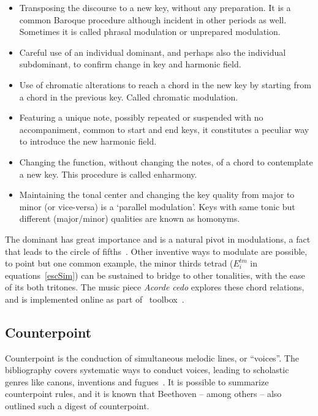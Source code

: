 \begin{itemize}
    \item Transposing the discourse to a new key, without any preparation. It is a common Baroque procedure although incident in other periods as well. Sometimes it is 
    called phrasal modulation or unprepared modulation.
    \item Careful use of an individual dominant, and perhaps also the individual
    subdominant, to confirm change in key and harmonic field.
    \item Use of chromatic alterations to reach a chord in the new key by starting from a chord in the previous key. Called chromatic modulation.
    \item Featuring a unique note, possibly repeated or suspended with no accompaniment, common to start and end keys, it constitutes a peculiar way
    to introduce the new harmonic field.
    \item Changing the function, without changing the notes, of a chord to
    contemplate a new key. This procedure is called enharmony.
    \item Maintaining the tonal center and changing the key quality from major to minor
    (or vice-versa) is a `parallel modulation'. Keys with same tonic but
		different (major/minor) qualities are known as homonyms.
\end{itemize}

The dominant has great importance and is a natural pivot in modulations,
a fact that leads to the circle of fifths~\cite{Harmonia,Salzer,Koellheuteur,Harmony}.
Other inventive ways to modulate are possible, to point but one common example, the minor thirds tetrad ($E_i^{tm}$ in equations~\ref{escSim}) can be sustained to bridge to other tonalities, with the ease of its both tritones.
The music piece \emph{Acorde cedo} explores these chord relations, and is implemented online as part of \massa\ toolbox~\cite{MASSA}.

\subsection{Counterpoint}\label{subsec:contraponto}
Counterpoint is the conduction of simultaneous melodic lines, or ``voices''. The bibliography covers systematic ways to conduct voices, leading to scholastic genres like canons, inventions and fugues~\cite{count1, count2}. It is possible to
summarize counterpoint rules, and it is known that Beethoven --
among others -- also outlined such a digest of counterpoint.

